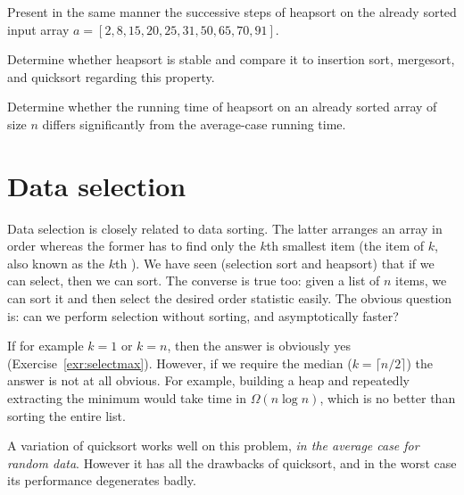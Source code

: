 \begin{Exercise}\label{exr:hsort:apply} 
Present in the same manner the successive steps of heapsort on
the already sorted input array 
\(a=[2, 8, 15, 20, 25, 31, 50, 65, 70, 91]\).
\end{Exercise}

\begin{Exercise}\label{exr:hsort:stable}
Determine whether heapsort is stable and compare it to insertion sort,
mergesort, and quicksort regarding this property. 
\end{Exercise}

\begin{Exercise}\label{exr:heapsort:sorted:already}
Determine whether the running time of heapsort on an already sorted array of 
size \(n\) differs significantly from the average-case running time.
\end{Exercise}


\section{Data selection}\label{sec:qselect}

Data selection is closely related to data sorting. The latter arranges
an array in order whereas the former has to find only the $k$th smallest item 
(the item of  \(k\), also known as the 
$k$th ). We have seen (selection sort and heapsort) 
that if we can select, then we can sort. The converse is true too: 
given a list of $n$ items, we can sort it and then select the desired order 
statistic easily. The obvious question is: can we perform selection without sorting, 
and asymptotically faster?

If for example $k=1$ or $k=n$, then the answer is obviously yes 
(Exercise~\ref{exr:selectmax}). However, if we require the median 
($k=\lceil n/2 \rceil$) the answer is not at all obvious. For example, building 
a heap and repeatedly extracting the minimum would take time in 
$\Omega(n\log n)$, which is no better than sorting the entire list.

A variation of quicksort works well on this problem, \emph{in the average case for random 
data}. However it has all the drawbacks of quicksort, and in the worst case its 
performance degenerates badly.

